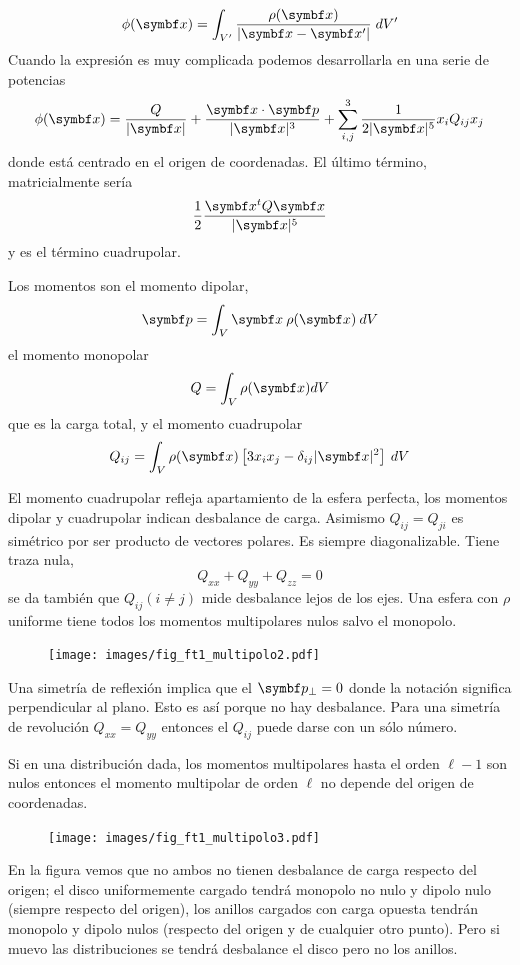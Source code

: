 \documentclass[10pt,oneside]{CBFT_book}
\begin{document}
\[
	\phi(\vb{x}) = \int_{V'} \frac{\rho(\vb{x})}{|\vb{x}-\vb{x}'|} \; dV'
\]
Cuando la expresión es muy complicada podemos desarrollarla en una serie de potencias
\[
	\phi(\vb{x}) = \frac{Q}{|\vb{x}|} + \frac{\vb{x}\cdot\vb{p}}{|\vb{x}|^3} +
	\sum_{i,j}^3 \frac{1}{2|\vb{x}|^5} x_i Q_{ij} x_j
\]
donde está centrado en el origen de coordenadas. El último término, matricialmente sería
\[
	\frac{1}{2} \frac{\vb{x}^t Q \vb{x}}{|\vb{x}|^5}
\]
y es el término cuadrupolar.

Los momentos son el momento dipolar,
\[
	\vb{p} = \int_V \vb{x} \: \rho(\vb{x}) \: dV
\]
el momento monopolar
\[
	Q = \int_V \rho(\vb{x}) dV
\]
que es la carga total, y el momento cuadrupolar
\[
	Q_{ij} = \int_V  \rho(\vb{x}) \left[ 3 x_i x_j - \delta_{ij} |\vb{x}|^2 \right] \: dV
\]

El momento cuadrupolar refleja apartamiento de la esfera perfecta, los momentos dipolar y cuadrupolar
indican desbalance de carga.
Asimismo $Q_{ij} = Q_{ji}$ es simétrico por ser producto de vectores polares.
Es siempre diagonalizable. Tiene traza nula,
\[
	Q_{xx} + Q_{yy} + Q_{zz}  = 0
\]
se da también que $Q_{ij} (i\neq j)$ mide desbalance lejos de los ejes.
Una esfera con $\rho$ uniforme tiene todos los momentos multipolares nulos salvo el monopolo.

\begin{figure}[htb]
	\begin{center}
	\texttt{[image: images/fig\_ft1\_multipolo2.pdf]}	 
	\end{center}
	\caption{}
\end{figure}

Una simetría de reflexión implica que el $\vb{p}_\perp = 0$ donde la notación significa perpendicular
al plano. Esto es así porque no hay desbalance. Para una simetría de revolución $Q_{xx}=Q_{yy}$ entonces
el $Q_{ij}$ puede darse con un sólo número.

Si en una distribución dada, los momentos multipolares hasta el orden $\ell -1$ son nulos entonces
el momento multipolar de orden $\ell$ no depende del origen de coordenadas.

\begin{figure}[htb]
	\begin{center}
	\texttt{[image: images/fig\_ft1\_multipolo3.pdf]}	 
	\end{center}
	\caption{}
\end{figure}

En la figura vemos que no ambos no tienen desbalance de carga respecto del origen; el disco uniformemente
cargado tendrá monopolo no nulo y dipolo nulo (siempre respecto del origen), los anillos cargados con carga
opuesta tendrán monopolo y dipolo nulos (respecto del origen y de cualquier otro punto). Pero si muevo las
distribuciones se tendrá desbalance el disco pero no los anillos.
\end{document}
